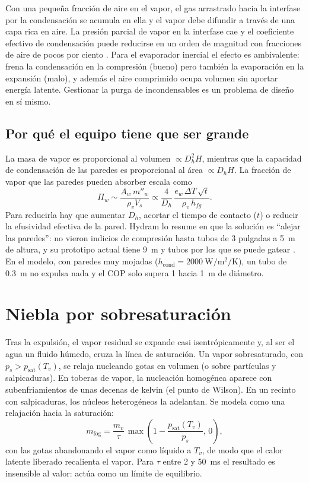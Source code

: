 \documentclass[11pt,a4paper]{article}
\newcommand{\psat}{p_{\mathrm{sat}}}
\newcommand{\hfg}{h_{fg}}
\newcommand{\mdot}{\dot m}
\begin{document}
Con una pequeña fracción de aire en el vapor, el gas arrastrado hacia la interfase por la condensación se acumula en ella y el vapor debe difundir a través de una capa rica en aire. La presión parcial de vapor en la interfase cae y el coeficiente efectivo de condensación puede reducirse en un orden de magnitud con fracciones de aire de pocos por ciento \cite{collier}. Para el evaporador inercial el efecto es ambivalente: frena la condensación en la compresión (bueno) pero también la evaporación en la expansión (malo), y además el aire comprimido ocupa volumen sin aportar energía latente. Gestionar la purga de incondensables es un problema de diseño en sí mismo.

\subsection{Por qué el equipo tiene que ser grande}

La masa de vapor es proporcional al volumen $\propto D_h^2 H$, mientras que la capacidad de condensación de las paredes es proporcional al área $\propto D_h H$. La fracción de vapor que las paredes pueden absorber escala como
\begin{equation}
\Pi_w \sim \frac{A_w\,m''_w}{\rho_v V_s} \propto \frac{4}{D_h}\,\frac{e_w\,\Delta T\,\sqrt{t}}{\rho_v\,\hfg}.
\end{equation}
Para reducirla hay que aumentar $D_h$, acortar el tiempo de contacto ($t$) o reducir la efusividad efectiva de la pared. Hydram lo resume en que la solución es ``alejar las paredes'': no vieron indicios de compresión hasta tubos de 3 pulgadas a \SI{5}{\metre} de altura, y su prototipo actual tiene \SI{9}{\metre} y tubos por los que se puede gatear \cite{hydramtech}. En el modelo, con paredes muy mojadas ($h_{\mathrm{cond}}=\SI{2000}{\watt\per\square\metre\per\kelvin}$), un tubo de \SI{0.3}{\metre} no expulsa nada y el COP solo supera 1 hacia \SI{1}{\metre} de diámetro.

\section{Niebla por sobresaturación}

Tras la expulsión, el vapor residual se expande casi isentrópicamente y, al ser el agua un fluido húmedo, cruza la línea de saturación. Un vapor sobresaturado, con $p_s > \psat(T_v)$, se relaja nucleando gotas en volumen (o sobre partículas y salpicaduras). En toberas de vapor, la nucleación homogénea aparece con subenfriamientos de unas decenas de kelvin (el punto de Wilson). En un recinto con salpicaduras, los núcleos heterogéneos la adelantan. Se modela como una relajación hacia la saturación:
\begin{equation}
\mdot_{\mathrm{fog}} = \frac{m_v}{\tau}\,\max\!\left(1 - \frac{\psat(T_v)}{p_s},\,0\right),
\end{equation}
con las gotas abandonando el vapor como líquido a $T_v$, de modo que el calor latente liberado recalienta el vapor. Para $\tau$ entre \SI{2}{} y \SI{50}{\milli\second} el resultado es insensible al valor: actúa como un límite de equilibrio.
\end{document}
